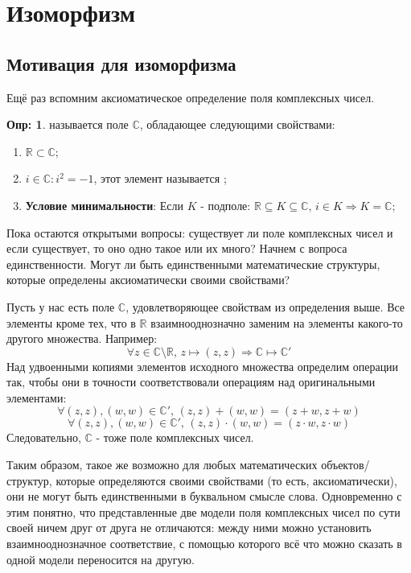 \documentclass[12pt]{article}
\newcommand{\RN}[1]{%
	\textup{\uppercase\expandafter{\romannumeral#1}}%
}
\newcommand{\MR}{\mathbb{R}}
\newcommand{\MC}{\mathbb{C}}
\theoremstyle{definition}
\newtheorem{defn}{Опр:}
\begin{document}
\lhead{Алгебра-\RN{1}}
\section*{Изоморфизм}
\subsection*{Мотивация для изоморфизма}
Ещё раз вспомним аксиоматическое определение поля комплексных чисел.
\begin{defn}
	 называется поле $\MC$, обладающее следующими свойствами:
	\begin{enumerate}[label=\arabic*)]
		\item $\MR \subset \MC$;
		\item $i \in \MC \colon i^2 = -1$, этот элемент называется ;
		\item \textbf{Условие минимальности}: Если $K$ - подполе: $\MR \subseteq K \subseteq \MC, \, i \in K \Rightarrow K = \MC$;
	\end{enumerate}
\end{defn}
Пока остаются открытыми вопросы: существует ли поле комплексных чисел и если существует, то оно одно такое или их много? Начнем с вопроса единственности. Могут ли быть единственными математические структуры, которые определены аксиоматически своими свойствами? 

Пусть у нас есть поле $\MC$, удовлетворяющее свойствам из определения выше. Все элементы кроме тех, что в $\MR$ взаимнооднозначно заменим на элементы какого-то другого множества. Например:
$$
	\forall z \in \MC \setminus \MR, \, z \mapsto (z,z) \Rightarrow \MC \mapsto \MC'
$$
Над удвоенными копиями элементов исходного множества определим операции так, чтобы они в точности соответствовали операциям над оригинальными элементами:
$$
	\forall (z,z), (w,w) \in \MC', \, (z,z) + (w,w) = (z + w, z + w)
$$ 
$$
	\forall (z,z), (w,w) \in \MC', \, (z,z){\cdot}(w,w) = (z{\cdot}w, z{\cdot}w)
$$
Следовательно, $\MC$ - тоже поле комплексных чисел. 

Таким образом, такое же возможно для любых математических объектов/структур, которые определяются своими свойствами (то есть, аксиоматически), они не могут быть единственными в буквальном смысле слова. Одновременно с этим понятно, что представленные две модели поля комплексных чисел по сути своей ничем друг от друга не отличаются: между ними можно установить взаимнооднозначное соответствие, с помощью которого всё что можно сказать в одной модели переносится на другую.
\end{document}
